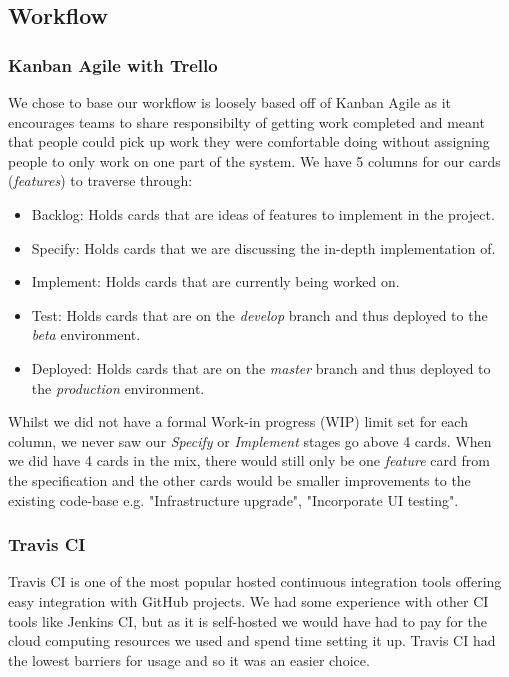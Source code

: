 \documentclass[11pt,a4paper]{report}
\begin{document}
\subsection{Workflow}

\subsubsection{Kanban Agile with Trello}

We chose to base our workflow is loosely based off of Kanban Agile as it encourages teams to share responsibilty of getting work completed \cite{website:altassian_kanban} and meant that people could pick up work they were comfortable doing without assigning people to only work on one part of the system. We have 5 columns for our cards (\emph{features}) to traverse through:

\begin{itemize}
  \item Backlog: Holds cards that are ideas of features to implement in the project.
  \item Specify: Holds cards that we are discussing the in-depth implementation of.
  \item Implement: Holds cards that are currently being worked on.
  \item Test: Holds cards that are on the \emph{develop} branch and thus deployed to the \emph{beta} environment.
  \item Deployed: Holds cards that are on the \emph{master} branch and thus deployed to the \emph{production} environment.
\end{itemize}

Whilst we did not have a formal Work-in progress (WIP) limit set for each column, we never saw our \emph{Specify} or \emph{Implement} stages go above 4 cards. When we did have 4 cards in the mix, there would still only be one \emph{feature} card from the specification and the other cards would be smaller improvements to the existing code-base e.g. "Infrastructure upgrade", "Incorporate UI testing".

\subsubsection{Travis CI}

Travis CI is one of the most popular hosted continuous integration tools offering easy integration with GitHub projects. We had some experience with other CI tools like Jenkins CI, but as it is self-hosted we would have had to pay for the cloud computing resources we used and spend time setting it up. Travis CI had the lowest barriers for usage and so it was an easier choice.
\end{document}
